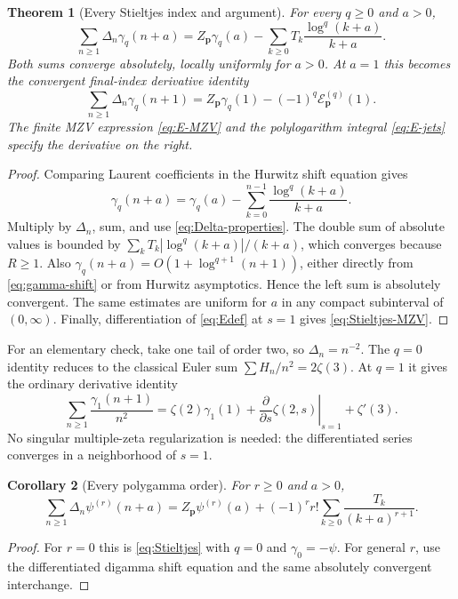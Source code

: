 \documentclass[11pt,letterpaper]{article}
\numberwithin{equation}{section}
\newtheorem{theorem}{Theorem}[section]
\newtheorem{corollary}[theorem]{Corollary}
\theoremstyle{definition}\newtheorem{definition}[theorem]{Definition}
\theoremstyle{remark}\newtheorem{remark}[theorem]{Remark}
\begin{document}
\begin{theorem}[Every Stieltjes index and argument]\label{thm:Stieltjes}
For every $q\ge0$ and $a>0$,
\begin{equation}\label{eq:Stieltjes}
 \boxed{\sum_{n\ge1}\Delta_n\gamma_q(n+a)
 =Z_{\boldsymbol p}\gamma_q(a)
       -\sum_{k\ge0}T_k\frac{\log^q(k+a)}{k+a}.}
\end{equation}
Both sums converge absolutely, locally uniformly for $a>0$.
At $a=1$ this becomes the convergent final-index derivative identity
\begin{equation}\label{eq:Stieltjes-MZV}
 \sum_{n\ge1}\Delta_n\gamma_q(n+1)
 =Z_{\boldsymbol p}\gamma_q(1)
                 -(-1)^q\mathcal E_{\boldsymbol p}^{(q)}(1).
\end{equation}
The finite MZV expression \eqref{eq:E-MZV} and the polylogarithm
integral \eqref{eq:E-jets} specify the derivative on the right.
\end{theorem}

\begin{proof}
Comparing Laurent coefficients in the Hurwitz shift equation gives
\begin{equation}\label{eq:gamma-shift}
 \gamma_q(n+a)=\gamma_q(a)
           -\sum_{k=0}^{n-1}\frac{\log^q(k+a)}{k+a}.
\end{equation}
Multiply by $\Delta_n$, sum, and use \eqref{eq:Delta-properties}.
The double sum of absolute values is bounded by
$\sum_k T_k|\log^q(k+a)|/(k+a)$, which converges because $R\ge1$.
Also $\gamma_q(n+a)=O(1+\log^{q+1}(n+1))$, either directly from
\eqref{eq:gamma-shift} or from Hurwitz asymptotics. Hence the left
sum is absolutely convergent. The same estimates are uniform
for $a$ in any compact subinterval of $(0,\infty)$.
Finally, differentiation of \eqref{eq:Edef} at $s=1$ gives
\eqref{eq:Stieltjes-MZV}.
\end{proof}

For an elementary check, take one tail of order two, so
$\Delta_n=n^{-2}$. The $q=0$ identity reduces to the classical
Euler sum $\sum H_n/n^2=2\zeta(3)$. At $q=1$ it gives the
ordinary derivative identity
\begin{equation}\label{eq:gamma1-example}
 \sum_{n\ge1}\frac{\gamma_1(n+1)}{n^2}
 =\zeta(2)\gamma_1(1)
   +\left.\frac{\partial}{\partial s}\zeta(2,s)\right|_{s=1}
   +\zeta'(3).
\end{equation}
No singular multiple-zeta regularization is needed: the differentiated
series converges in a neighborhood of $s=1$.

\begin{corollary}[Every polygamma order]\label{cor:polygamma}
For $r\ge0$ and $a>0$,
\begin{equation}\label{eq:polygamma-transport}
 \sum_{n\ge1}\Delta_n\psi^{(r)}(n+a)
 =Z_{\boldsymbol p}\psi^{(r)}(a)
       +(-1)^rr!\sum_{k\ge0}\frac{T_k}{(k+a)^{r+1}}.
\end{equation}
\end{corollary}
\begin{proof}
For $r=0$ this is \eqref{eq:Stieltjes} with $q=0$ and
$\gamma_0=-\psi$. For general $r$, use the differentiated digamma
shift equation and the same absolutely convergent interchange.
\end{proof}
\end{document}
